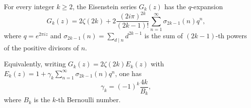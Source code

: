 For every integer $k \geq 2$, the Eisenstein series $G_k(z)$ has the $q$-expansion
$$G_k(z) = 2\zeta(2k) + 2 \frac{(2i\pi)^{2k}}{(2k-1)!} \sum_{n=1}^{\infty} \sigma_{2k-1}(n) q^n,$$
where $q = e^{2\pi i z}$ and $\sigma_{2k-1}(n) = \sum_{d \mid n} d^{2k-1}$ is the sum of $(2k-1)$-th powers of the positive divisors of $n$.

Equivalently, writing $G_k(z) = 2\zeta(2k) E_k(z)$ with $E_k(z) = 1 + \gamma_k \sum_{n=1}^{\infty} \sigma_{2k-1}(n) q^n$, one has
$$\gamma_k = (-1)^k \frac{4k}{B_k},$$
where $B_k$ is the $k$-th Bernoulli number.
